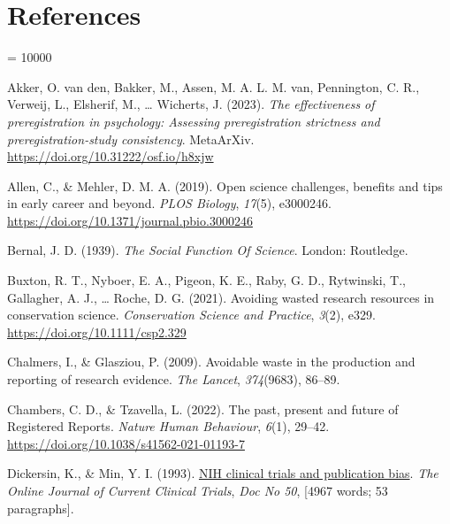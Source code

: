 \documentclass[
  ,jou, a4paper,floatsintext]{apa6}
\newlength{\cslhangindent}
\newlength{\cslentryspacingunit} %
\newenvironment{CSLReferences}[2] %
 {%
  \setlength{\parindent}{0pt}
  \ifodd #1
  \let\oldpar\par
  \def\par{\hangindent=\cslhangindent\oldpar}
  \fi
  \setlength{\parskip}{#2\cslentryspacingunit}
 }%
 {}
\begin{document}
\hypertarget{references}{%
\section{References}\label{references}}

\begingroup

\interlinepenalty = 10000

\hypertarget{refs}{}
\begin{CSLReferences}{1}{0}
\leavevmode{}%
Akker, O. van den, Bakker, M., Assen, M. A. L. M. van, Pennington, C. R., Verweij, L., Elsherif, M., \ldots{} Wicherts, J. (2023). \emph{The effectiveness of preregistration in psychology: {Assessing} preregistration strictness and preregistration-study consistency}. {MetaArXiv}. \url{https://doi.org/10.31222/osf.io/h8xjw}

\leavevmode{}%
Allen, C., \& Mehler, D. M. A. (2019). Open science challenges, benefits and tips in early career and beyond. \emph{PLOS Biology}, \emph{17}(5), e3000246. \url{https://doi.org/10.1371/journal.pbio.3000246}

\leavevmode{}%
Bernal, J. D. (1939). \emph{The {Social Function Of Science}}. {London}: {Routledge}.

\leavevmode{}%
Buxton, R. T., Nyboer, E. A., Pigeon, K. E., Raby, G. D., Rytwinski, T., Gallagher, A. J., \ldots{} Roche, D. G. (2021). Avoiding wasted research resources in conservation science. \emph{Conservation Science and Practice}, \emph{3}(2), e329. \url{https://doi.org/10.1111/csp2.329}

\leavevmode{}%
Chalmers, I., \& Glasziou, P. (2009). Avoidable waste in the production and reporting of research evidence. \emph{The Lancet}, \emph{374}(9683), 86--89.

\leavevmode{}%
Chambers, C. D., \& Tzavella, L. (2022). The past, present and future of {Registered Reports}. \emph{Nature Human Behaviour}, \emph{6}(1), 29--42. \url{https://doi.org/10.1038/s41562-021-01193-7}

\leavevmode{}%
Dickersin, K., \& Min, Y. I. (1993). \href{https://www.ncbi.nlm.nih.gov/pubmed/8306005}{{NIH} clinical trials and publication bias}. \emph{The Online Journal of Current Clinical Trials}, \emph{Doc No 50}, {[}4967 words; 53 paragraphs{]}.


\end{CSLReferences}
\end{document}
